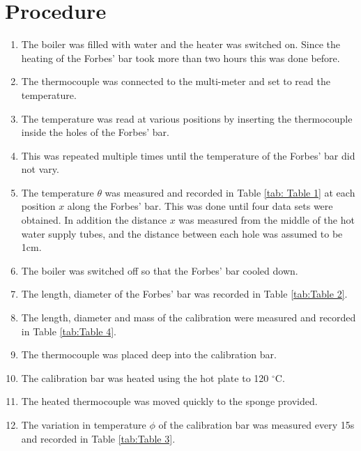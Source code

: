 \documentclass[12pt, a4paper]{article}
\begin{document}
\section*{Procedure}
\begin{enumerate}
    \item The boiler was filled with water and the heater was switched on. Since the heating of the Forbes' bar took more than two hours this was done before.
    \item The thermocouple was connected to the multi-meter and set to read the temperature.
    \item The temperature was read at various positions by inserting the thermocouple inside the holes of the Forbes' bar.
    \item This was repeated multiple times until the temperature of the Forbes' bar did not vary.
    \item The temperature $\theta$ was measured and recorded in Table \ref{tab: Table 1} at each position $x$ along the Forbes' bar. This was done until four data sets were obtained. In addition the distance $x$ was measured from the middle of the hot water supply tubes, and the distance between each hole was assumed to be 1cm.
    \item The boiler was switched off so that the Forbes' bar cooled down.
    \item The length, diameter of the Forbes' bar was recorded in Table \ref{tab:Table 2}.
    \item The length, diameter and mass of the calibration were measured and recorded in Table \ref{tab:Table 4}.
    \item The thermocouple was placed deep into the calibration bar.
    \item The calibration bar was heated using the hot plate to 120 $^{\circ}$C.
    \item The heated thermocouple was moved quickly to the sponge provided. 
    \item The variation in temperature $\phi$ of the calibration bar was measured every 15s and recorded in Table \ref{tab:Table 3}.
\end{enumerate}
\end{document}
